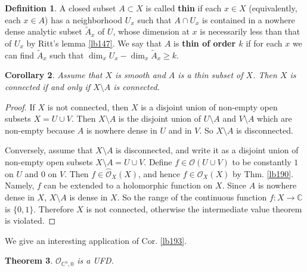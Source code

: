\documentclass[12pt,b5paper,notitlepage]{report}
\theoremstyle{definition}
\newtheorem{df}{Definition}[section]
\theoremstyle{plain}
\newtheorem{thm}[df]{Theorem}
\newtheorem{co}[df]{Corollary}
\newcommand{\wtd}{\widetilde}
\newcommand{\scr}{\mathscr}
\newcommand{\Cbb}{\mathbb C}
\newcommand{\Owht}{\widehat{\scr O}}
\numberwithin{equation}{section}
\begin{document}
\begin{df}
A closed subset $A\subset X$ is called \textbf{thin} if each $x\in X$ (equivalently, each $x\in A$) has a neighborhood $U_x$ such that $A\cap U_x$ is contained in a nowhere dense analytic subset $\wtd A_x$ of $U$, whose dimension at $x$ is necessarily less than that of $U_x$ by Ritt's lemma \ref{lb147}. We say that $A$ is \textbf{thin of order $k$} if for each $x$ we can find $\wtd A_x$ such that $\dim_xU_x-\dim_x\wtd A_x\geq k$. 
\end{df}



\begin{co}\label{lb215}
Assume that $X$ is smooth and $A$ is a thin subset of $X$. Then $X$ is connected if and only if $X\setminus A$ is connected.
\end{co}



\begin{proof}
If $X$ is not connected, then $X$ is a disjoint union of non-empty open subsets $X=U\cup V$. Then $X\setminus A$ is the disjoint union of $U\setminus A$ and $V\setminus A$ which are non-empty because $A$ is nowhere dense in $U$ and in $V$. So $X\setminus A$ is disconnected.

Conversely, assume that $X\setminus A$ is disconnected, and write it as a disjoint union of non-empty open subsets $X\setminus A=U\cup V$. Define $f\in\scr O(U\cup V)$ to be constantly $1$ on $U$ and $0$ on $V$. Then $f\in\Owht_X(X)$, and hence $f\in\scr O_X(X)$ by Thm. \ref{lb190}. Namely, $f$ can be extended to a holomorphic function on $X$. Since $A$ is nowhere dense in $X$, $X\setminus A$ is dense in $X$. So the range of the continuous function $f:X\rightarrow\Cbb$ is $\{0,1\}$. Therefore $X$ is not connected, otherwise the intermediate value theorem is violated.
\end{proof}



We give an interesting application of Cor. \ref{lb193}.


\begin{thm}
$\scr O_{\Cbb^n,0}$ is a UFD.
\end{thm}
\end{document}
